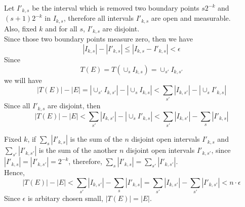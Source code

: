 \documentclass[a4paper,11pt]{article}
\begin{document}
\begin{enumerate}
Let $I'_{k,s}$ be the interval which is removed two boundary points $s2^{-k}$ and $(s+1)2^{-k}$ in $I_{k,s}$, therefore all intervals $I'_{k,s}$ are open and measurable.\\
Also, fixed $k$ and for all $s$, $I'_{k,s}$ are disjoint.\\
Since those two boundary points measure zero, then we have
$$|I_{k,s}| - |I'_{k,s}| \leq |I_{k,s} - I'_{k,s}| < \epsilon$$
Since
$$T(E) = T(\cup_s I_{k,s}) = \cup_{s'} I_{k,s'}$$
we will have
$$|T(E)| - |E| = |\cup_{s'} I_{k,s'}| - |\cup_s I_{k,s}|
< \sum_{s'} |I_{k,s'}| - |\cup_s I'_{k,s}|$$
Since all $I'_{k,s}$ are disjoint, then
$$|T(E)| - |E| < \sum_{s'} |I_{k,s'}| - |\cup_s I'_{k,s}| < \sum_{s'} |I_{k,s'}| - \sum_s |I'_{k,s}|$$

Fixed $k$, if $\sum_{s} |I'_{k,s}|$ is the sum of the $n$ disjoint open intervals $I'_{k,s}$ and $\sum_{s'} |I'_{k,s'}|$ is the sum of the another $n$ disjoint open intervals $I'_{k,s'}$, since $|I'_{k,s}| = |I'_{k,s'}| = 2^{-k}$, therefore, $\sum_{s} |I'_{k,s}| = \sum_{s'} |I'_{k,s'}|$.\\
Hence,
$$|T(E)| - |E|
< \sum_{s'} |I_{k,s'}| - \sum_s |I'_{k,s}|
= \sum_{s'} |I_{k,s'}| - \sum_{s'} |I'_{k,s'}| < n \cdot \epsilon$$
Since $\epsilon$ is arbitary chosen small, $|T(E)| = |E|$.
\end{enumerate}
\end{document}
